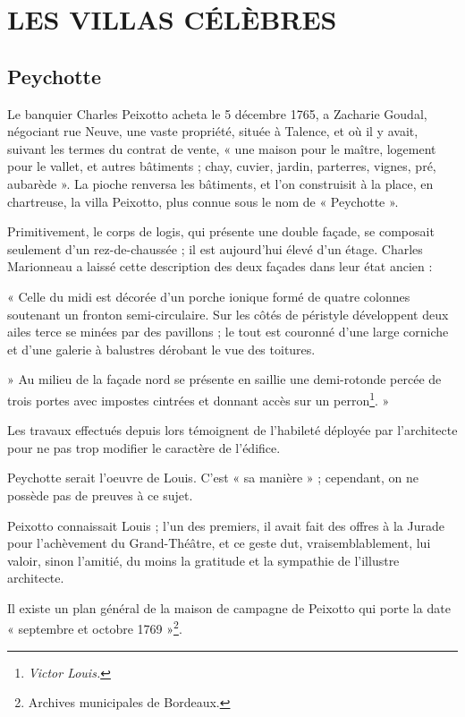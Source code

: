 
\chapter{LES VILLAS CÉLÈBRES}
\section{Peychotte}

Le banquier Charles Peixotto acheta le 5 décembre 1765, a Zacharie Goudal, négociant rue Neuve, une vaste propriété, située à Talence, et où il y avait, suivant les termes du contrat de vente, « une maison pour le maître, logement pour le vallet, et autres bâtiments ; chay, cuvier, jardin, parterres, vignes, pré, aubarède ». La pioche renversa les bâtiments, et l'on construisit à la place, en chartreuse, la villa Peixotto, plus connue sous le nom de « Peychotte ».

Primitivement, le corps de logis, qui présente une double façade, se composait seulement d'un rez-de-chaussée ; il est aujourd'hui élevé d'un étage. Charles Marionneau a laissé cette description des deux façades dans leur état ancien :

« Celle du midi est décorée d'un porche ionique formé de quatre colonnes soutenant un fronton semi-circulaire. Sur les côtés de péristyle développent deux ailes terce se minées par des pavillons ; le tout est couronné d'une large corniche et d'une galerie à balustres dérobant le vue des toitures.

» Au milieu de la façade nord se présente en saillie une demi-rotonde percée de trois portes avec impostes cintrées et donnant accès sur un perron\footnote{\textit{Victor Louis.}}. »

Les travaux effectués depuis lors témoignent de l'habileté déployée par l'architecte pour ne pas trop modifier le caractère de l'édifice.

Peychotte serait l'oeuvre de Louis. C'est « sa manière » ; cependant, on ne possède pas de preuves à ce sujet.

Peixotto connaissait Louis ; l'un des premiers, il avait fait des offres à la Jurade pour l'achèvement du Grand-Théâtre, et ce geste dut, vraisemblablement, lui valoir, sinon l'amitié, du moins la gratitude et la sympathie de l'illustre architecte.

Il existe un plan général de la maison de campagne de Peixotto qui porte la date « septembre et octobre 1769 »\footnote{Archives municipales de Bordeaux.}.


